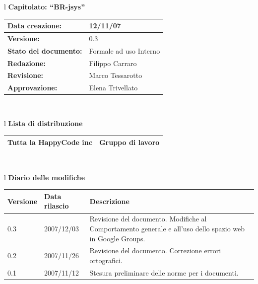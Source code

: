 \documentclass[11pt,titlepage,a4paper]{report}
\begin{document}
\begin{center}
\thispagestyle{plain}
\begin{table}[htbp]
\large{
\begin{tabular}{l}
\Large{\textbf{\textsf{Capitolato: ``BR-jsys''}}} \\
\begin{tabular}{||p{6cm}||p{6cm}||}
\hline
\textbf{Data creazione:} & 12/11/07 \\
\hline
\textbf{Versione:} & 0.3 \\
\hline
\textbf{Stato del documento:} & Formale ad uso Interno \\
\hline
\textbf{Redazione:} & Filippo Carraro \\
\hline
\textbf{Revisione:} & Marco Tessarotto \\
\hline
\textbf{Approvazione:}  & Elena Trivellato\\
\hline
\end{tabular} \\
\end{tabular}
}
\end{table}

\begin{table}[hbtp]
\large{
\begin{tabular}{l}
\Large{\textbf{\textsf{Lista di distribuzione}}} \\
\begin{tabular}{||p{6cm}||p{6cm}||}
\hline
{Tutta la HappyCode inc}& Gruppo di lavoro \\
\hline
\end{tabular} \\
\end{tabular}
}
\end{table}

\begin{table}[hbtp]
\large{
\begin{tabular}{l}
\Large{\textbf{\textsf{Diario delle modifiche}}} \\
\begin{tabular}{||p{2cm}||p{3.5cm}||p{6cm}||}
\hline
\textbf{Versione} & \textbf{Data rilascio} & \textbf{Descrizione} \\
\hline
0.3 & 2007/12/03 & Revisione del documento. Modifiche al Comportamento generale e all'uso dello spazio web in Google Groups. \\
\hline
\hline
0.2 & 2007/11/26 & Revisione del documento. Correzione errori ortografici. \\
\hline
\hline
0.1 & 2007/11/12 & Stesura preliminare delle norme per i documenti. \\
\hline
\end{tabular} \\
\end{tabular}

}
\end{table}
\end{center}
\end{document}
